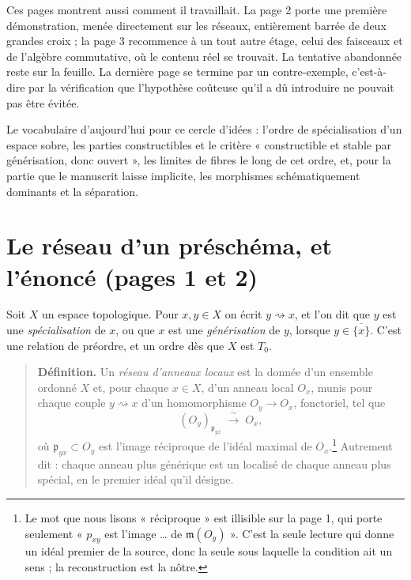 \documentclass[11pt,a4paper]{article}
\begin{document}
\begin{resume}
Ces pages montrent aussi comment il travaillait. La page 2 porte une première
démonstration, menée directement sur les réseaux, entièrement barrée de deux
grandes croix ; la page 3 recommence à un tout autre étage, celui des
faisceaux et de l'algèbre commutative, où le contenu réel se trouvait. La
tentative abandonnée reste sur la feuille. La dernière
page se termine par un contre-exemple, c'est-à-dire par la vérification que
l'hypothèse coûteuse qu'il a dû introduire ne pouvait pas être évitée.

Le vocabulaire d'aujourd'hui pour ce cercle d'idées : l'ordre de
spécialisation d'un espace sobre, les parties constructibles et le critère
« constructible et stable par générisation, donc ouvert », les limites de
fibres le long de cet ordre, et, pour la partie que le manuscrit laisse
implicite, les morphismes schématiquement dominants et la séparation.

\end{resume}

\section*{Le réseau d'un préschéma, et l'énoncé (pages 1 et 2)}

Soit $X$ un espace topologique. Pour $x, y \in X$ on écrit $y \rightsquigarrow
x$, et l'on dit que $y$ est une \emph{spécialisation} de $x$, ou que $x$ est
une \emph{générisation} de $y$, lorsque $y \in \overline{\{x\}}$. C'est une
relation de préordre, et un ordre dès que $X$ est $T_0$.

\begin{quote}
\textbf{Définition.} Un \emph{réseau d'anneaux locaux} est la donnée d'un
ensemble ordonné $X$ et, pour chaque $x \in X$, d'un anneau local $O_x$,
munis pour chaque couple $y \rightsquigarrow x$ d'un homomorphisme
$O_y \to O_x$, fonctoriel, tel que
\[ (O_y)_{\mathfrak p_{yx}} \;\xrightarrow{\ \sim\ }\; O_x, \]
où $\mathfrak p_{yx} \subset O_y$ est l'image réciproque de l'idéal maximal
de $O_x$.\footnote{Le mot que nous lisons « réciproque » est illisible sur la
page 1, qui porte seulement « $p_{xy}$ est l'image … de
$\mathfrak m(O_y)$ ». C'est la seule lecture qui donne un idéal premier de la
source, donc la seule sous laquelle la condition ait un sens ; la
reconstruction est la nôtre.} Autrement dit : chaque anneau plus générique est un localisé de
chaque anneau plus spécial, en le premier idéal qu'il désigne.
\end{quote}
\end{document}
